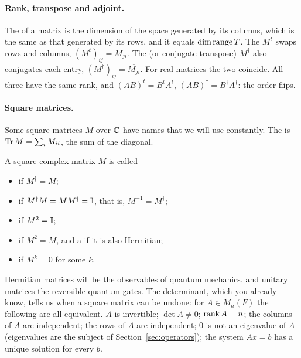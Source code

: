 \paragraph{Rank, transpose and adjoint.}
The  of a matrix is the dimension of the space generated by its columns, which is the same as that generated by its rows, and it equals $\dim\operatorname{range} T$. The  $M^{t}$ swaps rows and columns, $(M^t)_{ij}=M_{ji}$. The  (or conjugate transpose) $M^\dagger$ also conjugates each entry, $(M^\dagger)_{ij}=\overline{M_{ji}}$. For real matrices the two coincide.
All three have the same rank, and $(AB)^t=B^tA^t$, $(AB)^\dagger=B^\dagger A^\dagger$: the order flips.

\paragraph{Square matrices.}
Some square matrices $M$ over $\mathbb{C}$ have names that we will use constantly. The  is $\operatorname{Tr} M=\sum_iM_{ii}$, the sum of the diagonal.

\begin{definition}\label{def:special}
  A square complex matrix $M$ is called
  \begin{itemize}
    \item {} if $M^\dagger=M$;
    \item {} if $M^\dagger M=MM^\dagger=\mathbb{I}$, that is, $M^{-1}=M^\dagger$;
    \item {} if $M^2=\mathbb{I}$;
    \item {} if $M^2=M$, and a  if it is also Hermitian;
    \item {} if $M^k=0$ for some $k$.
  \end{itemize}
\end{definition}

Hermitian matrices will be the observables of quantum mechanics, and unitary matrices the reversible quantum gates. The determinant, which you already know, tells us when a square matrix can be undone: for $A\in M_n(F)$ the following are all equivalent. $A$ is invertible; $\det A\neq0$; $\operatorname{rank} A=n$; the columns of $A$ are independent; the rows of $A$ are independent; $0$ is not an eigenvalue of $A$ (eigenvalues are the subject of Section~\ref{sec:operators}); the system $Ax=b$ has a unique solution for every $b$.

